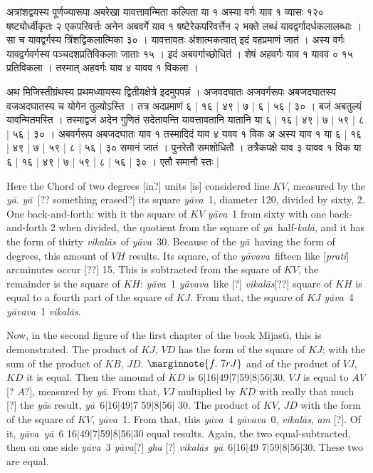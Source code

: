 \documentclass[11pt,a5paper]{book}
\def\kala{\textit{ka\-l\=a}}
\def\ya{\textit{y\=a}}
\def\yava{\textit{y\=ava}}
\def\yavava{\textit{y\=avava}}
\def\vikalas{\textit{vi\-ka\-l\=as}}
\def\danda{$|$}
\begin{document}
{\newpage
{\s अत्रांशद्वयस्य पूर्णज्यारूपा अबरेखा
यावत्तावन्मिता कल्पिता या १ अस्या वर्गः 
याव १ व्यासः १२० षष्ट्योर्ध्वीकृतः २ एकपरिवर्त्तः अनेन अबवर्गे याव १ षष्टेरेकपरिवर्त्तेन २ भक्ते लब्धं
यावद्वर्गादर्धकलालब्धाः । सा च यावद्वर्गस्य त्रिंशद्विकलात्मिका ३० ।
यावत्तावतः अंशात्मकत्वात् इदं वहप्रमाणं जातं । अस्य वर्गः यावद्वर्गवर्गस्य 
पञ्चदशप्रतिविकलाः जाताः १५ । इदं अबवर्गाच्छोधितं । 
शेषं अहवर्गः याव १ यावव ० १५ प्रतिविकला । तस्मात् अहवर्गः याव ४ यावव ${\dot{१}}$ विकला । 

अथ मिजिस्तीग्रंथस्य प्रथमध्यायस्य द्वितीयक्षेत्रे इदमुपपन्नं । अजवदघातः अजवर्गरूपः
अबजदघातस्य वजअदघातस्य च योगेन तुल्योऽस्ति । तत्र अदप्रमाणं ६ | १६ | ४९ | ७ | ६ | ५६ | ३० । 
बजं अबतुल्यं
यावन्मितमस्ति । तस्माद्वजं अदेन गुणितं सदेतावन्ति यावत्तावतानि यातानि या ६ | १६ | ४९ | ७ | ५९ | ८ | ५६ | ३० । 
अबवर्गरूप अबजदघातः याव १
तस्मादिदं याव ४ यवव १ विक अ अस्य याव १ या ६ | १६ | ४९ | ७ | ५९ | ८ | ५६ | ३० समानं जातं । 
पुनरेतौ समशोधितौ । तत्रैकपक्षे
याव ३ यावव १ विक या ६ | १६ | ४९ | ७ | ५९ | ८ | ५६ | ३० । एतौ समानौ स्तः |}
\newpage
Here the Chord of two degrees [in?] units [is] considered line $KV$, measured by the \ya. 
\ya\ [?? something erased?] its square \yava\ 1, diameter 120, divided by sixty, 2. 
One back-and-forth: with it the square of $KV$ \yava\ 1 from sixty with one back-and-forth 2
when divided, the quotient from the square of \ya\ half-\kala, and it has the form of thirty \vikalas\
of \yava\ 30. Because of the \ya\ having the form of degrees, this amount of 
$VH$ results. Its square,  of the \yavava\ fifteen like [\textit{prati}] arcminutes occur [??] 15. 
This is subtracted from the square of $KV$, the remainder is the square of $KH$: 
\yava\ 1 \yavava\ like [?] \vikalas [??] square of $KH$ is equal to a fourth part of the
square of $KJ$. From that, the square of $KJ$ \yava\ 4 \yavava\ 1 \vikalas.

Now, in the second figure of the first chapter of the book Mijast\={\i}, this is demonstrated.
The product of $KJ$, $VD$ has the form of the square of $KJ$; with
the sum of the product of $KB$, $JD$. 
$\marginnote{f.~7r J}$
and of the product of $VJ$, $KD$ it is equal.  Then the amound of $KD$ is 
6\danda 16\danda 49\danda 7\danda 59\danda 8\danda 56\danda 30.  $VJ$ is equal to 
$AV$ [? $A$?], measured by \ya.  From that, $VJ$ multiplied by $KD$ with really
that much [?] the \ya s result, \ya\ 6\danda 16\danda 49\danda 7 59\danda 8\danda 56\danda
30. 
The product of $KV$, $JD$ with the form of
the square of $KV$, \yava\ 1. From that, this \yava\ 4 \yavava\ 0, \vikalas, 
\textit{a\*m} [?]. Of it, \yava\ \ya\ 6 16\danda 49\danda 7\danda 59\danda 8\danda 56\danda 30
equal results. Again, the two equal-subtracted, then on one side \yava\ 3 \yava  [?] \textit{gha} [?]
\vikalas\ \ya\ 6\danda 16\danda 49 7\danda 59\danda 8\danda 56\danda 30. These two are equal.

}
\end{document}
